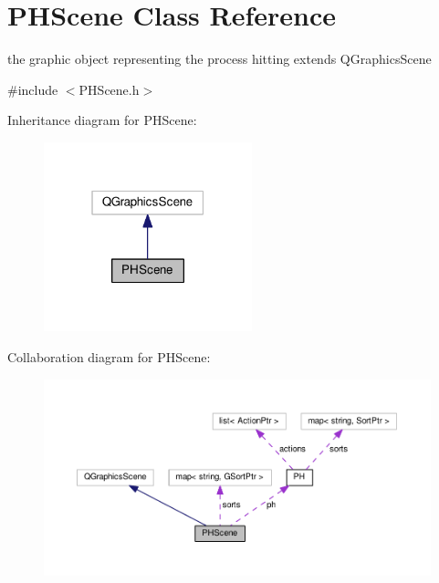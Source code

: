 \hypertarget{classPHScene}{\section{P\+H\+Scene Class Reference}
\label{classPHScene}
}


the graphic object representing the process hitting extends Q\+Graphics\+Scene  




{\ttfamily \#include $<$P\+H\+Scene.\+h$>$}



Inheritance diagram for P\+H\+Scene\+:\nopagebreak
\begin{figure}[H]
\begin{center}
\leavevmode
\includegraphics[width=171pt]{classPHScene__inherit__graph}
\end{center}
\end{figure}


Collaboration diagram for P\+H\+Scene\+:\nopagebreak
\begin{figure}[H]
\begin{center}
\leavevmode
\includegraphics[width=350pt]{classPHScene__coll__graph}
\end{center}
\end{figure}
